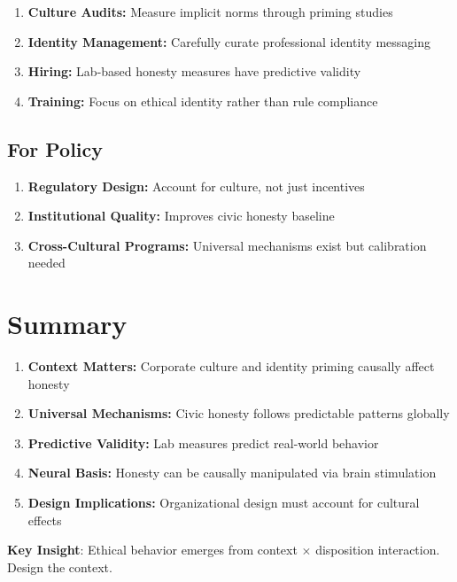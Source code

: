 \begin{enumerate}
    \item \textbf{Culture Audits:} Measure implicit norms through priming studies
    \item \textbf{Identity Management:} Carefully curate professional identity messaging
    \item \textbf{Hiring:} Lab-based honesty measures have predictive validity
    \item \textbf{Training:} Focus on ethical identity rather than rule compliance
\end{enumerate}

\subsection{For Policy}

\begin{enumerate}
    \item \textbf{Regulatory Design:} Account for culture, not just incentives
    \item \textbf{Institutional Quality:} Improves civic honesty baseline
    \item \textbf{Cross-Cultural Programs:} Universal mechanisms exist but calibration needed
\end{enumerate}

\section{Summary}

\begin{tcolorbox}[colback=gray!10!white,colframe=gray!50!black,title=Key Takeaways]
\begin{enumerate}
    \item \textbf{Context Matters:} Corporate culture and identity priming causally affect honesty
    \item \textbf{Universal Mechanisms:} Civic honesty follows predictable patterns globally
    \item \textbf{Predictive Validity:} Lab measures predict real-world behavior
    \item \textbf{Neural Basis:} Honesty can be causally manipulated via brain stimulation
    \item \textbf{Design Implications:} Organizational design must account for cultural effects
\end{enumerate}

\textbf{Key Insight}: Ethical behavior emerges from context $\times$ disposition interaction. Design the context.
\end{tcolorbox}

